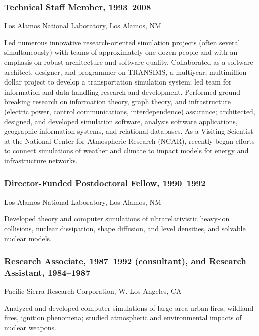\documentclass[]{article}
\begin{document}
\subsubsection{Technical Staff Member,
1993--2008}\label{technical-staff-member-19932008}

Los Alamos National Laboratory, Los Alamos, NM

Led numerous innovative research-oriented simulation projects (often
several simultaneously) with teams of approximately one dozen people and
with an emphasis on robust architecture and software quality.
Collaborated as a software architect, designer, and programmer on
TRANSIMS, a multiyear, multimillion-dollar project to develop a
transportation simulation system; led team for information and data
handling research and development. Performed ground-breaking research on
information theory, graph theory, and infrastructure (electric power,
control communications, interdependence) assurance; architected,
designed, and developed simulation software, analysis software
applications, geographic information systems, and relational databases.
As a Visiting Scientist at the National Center for Atmospheric Research
(NCAR), recently began efforts to connect simulations of weather and
climate to impact models for energy and infrastructure networks.

\subsubsection{Director-Funded Postdoctoral Fellow,
1990--1992}\label{director-funded-postdoctoral-fellow-19901992}

Los Alamos National Laboratory, Los Alamos, NM

Developed theory and computer simulations of ultrarelativistic heavy-ion
collisions, nuclear dissipation, shape diffusion, and level densities,
and solvable nuclear models.

\subsubsection{Research Associate, 1987--1992 (consultant), and Research
Assistant,
1984--1987}\label{research-associate-19871992-consultant-and-research-assistant-19841987}

Pacific-Sierra Research Corporation, W. Los Angeles, CA

Analyzed and developed computer simulations of large area urban fires,
wildland fires, ignition phenomena; studied atmospheric and
environmental impacts of nuclear weapons.
\end{document}
